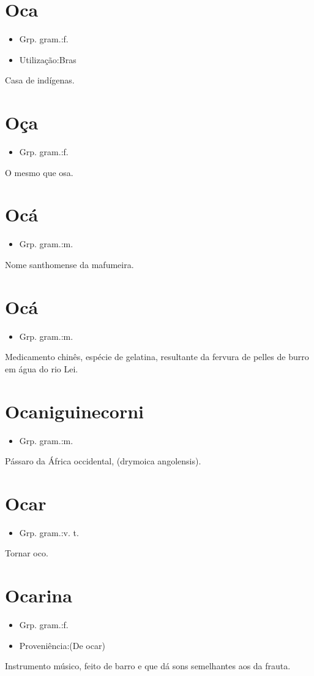 \section{Oca}
\begin{itemize}
\item {Grp. gram.:f.}
\end{itemize}
\begin{itemize}
\item {Utilização:Bras}
\end{itemize}
Casa de indígenas.
\section{Oça}
\begin{itemize}
\item {Grp. gram.:f.}
\end{itemize}
O mesmo que \textunderscore osa\textunderscore .
\section{Ocá}
\begin{itemize}
\item {Grp. gram.:m.}
\end{itemize}
Nome santhomense da mafumeira.
\section{Ocá}
\begin{itemize}
\item {Grp. gram.:m.}
\end{itemize}
Medicamento chinês, espécie de gelatina, resultante da fervura de pelles de burro em água do rio Lei.
\section{Ocaniguinecorni}
\begin{itemize}
\item {Grp. gram.:m.}
\end{itemize}
Pássaro da África occidental, (\textunderscore drymoica angolensis\textunderscore ).
\section{Ocar}
\begin{itemize}
\item {Grp. gram.:v. t.}
\end{itemize}
Tornar oco.
\section{Ocarina}
\begin{itemize}
\item {Grp. gram.:f.}
\end{itemize}
\begin{itemize}
\item {Proveniência:(De \textunderscore ocar\textunderscore )}
\end{itemize}
Instrumento músico, feito de barro e que dá sons semelhantes aos da frauta.
